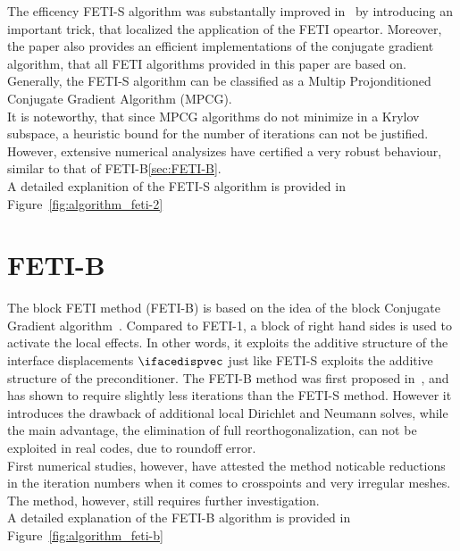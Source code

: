 \documentclass[preview]{standalone} %
\begin{document}
The efficency FETI-S algorithm was substantally improved in~\cite{Gosselet2015} by introducing an important trick, that localized the application of the FETI opeartor.
Moreover, the paper also provides an efficient implementations of the conjugate gradient algorithm, that all FETI algorithms provided in this paper are based on.
Generally, the FETI-S algorithm can be classified as a Multip Projonditioned Conjugate Gradient Algorithm (MPCG)\cite{Bridson2006}.\\
It is noteworthy, that since MPCG algorithms do not minimize in a Krylov subspace, a heuristic bound for the number of iterations can not be justified. However, extensive numerical analysizes have certified a very robust behaviour, similar to that of FETI-B\ref{sec:FETI-B}.\\
A detailed explanition of the FETI-S algorithm is provided in Figure~\ref{fig:algorithm_feti-2}



\section{FETI-B}
The block FETI method (FETI-B) is based on the idea of the block Conjugate Gradient algorithm~\cite{OLeary1980}.
Compared to FETI-1, a block of right hand sides is used to activate the local effects. In other words, it exploits the additive structure of the interface displacements $\ifacedispvec$ just like FETI-S exploits the additive structure of the preconditioner. The FETI-B method was first proposed in~\cite{Gosselet2015}, and has shown to require slightly less iterations than the FETI-S method. However it introduces the drawback of additional local Dirichlet and Neumann solves, while the main advantage, the elimination of full reorthogonalization, can not be exploited in real codes, due to roundoff error.\\
First numerical studies, however, have attested the method noticable reductions in the iteration numbers when it comes to crosspoints and very irregular meshes. The method, however, still requires further investigation.\\
A detailed explanation of the FETI-B algorithm is provided in Figure~\ref{fig:algorithm_feti-b}
\end{document}
